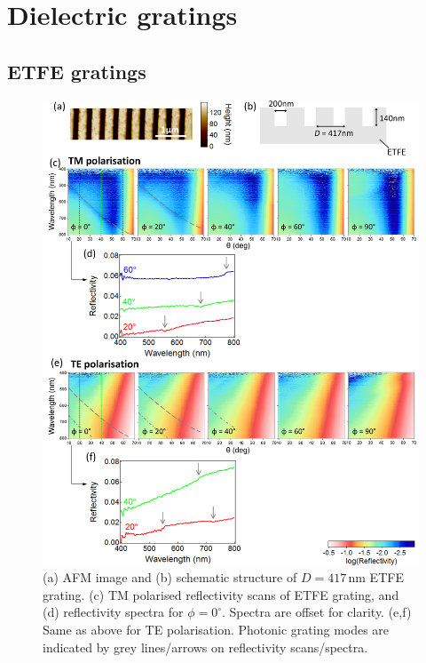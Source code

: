 \section{Dielectric gratings}
\subsection{ETFE gratings}
\begin{figure}[h!] 
\centering    
\includegraphics[width=\textwidth]{Fig2}
\caption[(a) AFM image and (b) schematic structure of $D=417$\,nm ETFE grating. Reflectivity measurements of ETFE grating in (c,d) TM and (e.f) TE polarisation.]{(a) AFM image and (b) schematic structure of $D=417$\,nm ETFE grating. (c) TM polarised reflectivity scans of ETFE grating, and (d) reflectivity spectra for $\phi=0^{\circ}$. Spectra are offset for clarity. (e,f) Same as above for TE polarisation. Photonic grating modes are indicated by grey lines/arrows on reflectivity scans/spectra.}
\label{7Fig2}
\end{figure}

